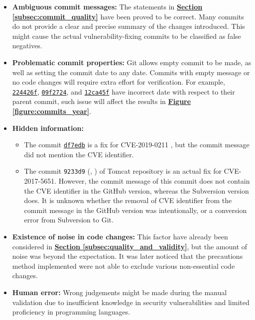 \documentclass[12pt, a4paper]{report}
\begin{document}
\begin{itemize}
  \item \textbf{Ambiguous commit messages:} The statements in
  \hyperref[subsec:commit_quality]{\textbf{Section \ref*{subsec:commit_quality}}} have been proved
  to be correct. Many commits do not provide a clear and precise summary of the changes introduced.
  This might cause the actual vulnerability-fixing commits to be classified as false negatives.
  \item \textbf{Problematic commit properties:} Git allows empty commit to be made, as well as
  setting the commit date to any date. Commits with empty message or no code changes will require
  extra effort for verification. For example,
  \href{https://github.com/torvalds/linux/commit/224426f}{\color{blue}\texttt{224426f}},
  \href{https://github.com/torvalds/linux/commit/09f2724}{\color{blue}\texttt{09f2724}}, and
  \href{https://github.com/torvalds/linux/commit/12ca45f}{\color{blue}\texttt{12ca45f}} have
  incorrect date with respect to their parent commit, such issue will affect the results in
  \hyperref[figure:commits_year]{\textbf{Figure \ref*{figure:commits_year}}}.
  \item \textbf{Hidden information:}
  \begin{itemize}
    \item The commit
    \href{https://github.com/apache/httpd/commit/df7edb}{\color{blue}\texttt{df7edb}} is a fix for
    CVE-2019-0211 \cite{cve_2019_0211}, but the commit message did not mention the CVE identifier.
    \item The commit {\texttt{9233d9}}
    (\href{https://github.com/apache/tomcat/commit/9233d9}{\color{blue}{GitHub link}},
    \href{https://svn.apache.org/viewvc?view=revision&revision=1788544}{\color{blue}{Subversion
    link}}) of Tomcat repository is an actual fix for CVE-2017-5651. However, the commit message of
    this commit does not contain the CVE identifier in the GitHub version, whereas the Subversion
    version does. It is unknown whether the removal of CVE identifier from the commit message in the
    GitHub version was intentionally, or a conversion error from Subversion to Git.
  \end{itemize}
  \item \textbf{Existence of noise in code changes:} This factor have already been considered in
  \hyperref[subsec:quality_and_validity]{\textbf{Section \ref*{subsec:quality_and_validity}}}, but
  the amount of noise was beyond the expectation. It was later noticed that the precautions method
  implemented were not able to exclude various non-essential code changes.
  \item \textbf{Human error:} Wrong judgements might be made during the manual validation due to
  insufficient knowledge in security vulnerabilities and limited proficiency in programming
  languages.
\end{itemize}
\end{document}
